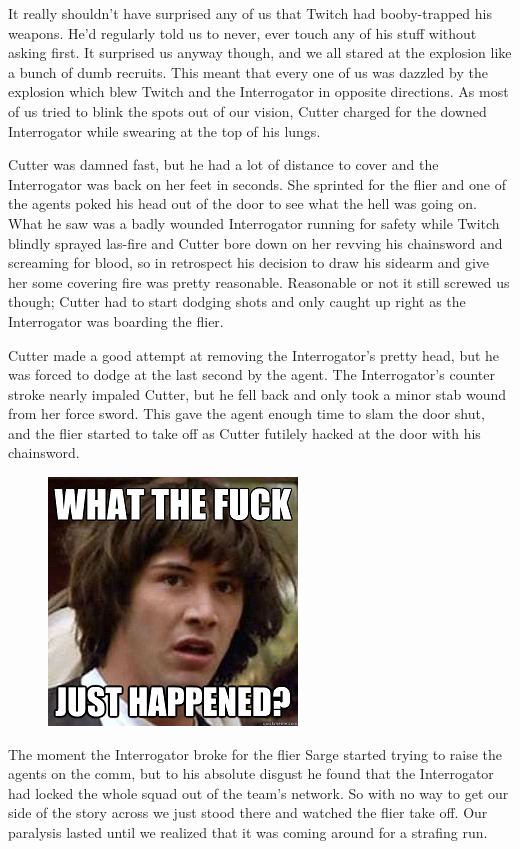 It really shouldn’t have surprised any of us that Twitch had booby-trapped his weapons. He’d regularly told us to never, ever touch any of his stuff without asking first. 
It surprised us anyway though, and we all stared at the explosion like a bunch of dumb recruits. 
This meant that every one of us was dazzled by the explosion which blew Twitch and the Interrogator in opposite directions. 
As most of us tried to blink the spots out of our vision, Cutter charged for the downed Interrogator while swearing at the top of his lungs.

Cutter was damned fast, but he had a lot of distance to cover and the Interrogator was back on her feet in seconds. 
She sprinted for the flier and one of the agents poked his head out of the door to see what the hell was going on. 
What he saw was a badly wounded Interrogator running for safety while Twitch blindly sprayed las-fire and Cutter bore down on her revving his chainsword and screaming for blood, so in retrospect his decision to draw his sidearm and give her some covering fire was pretty reasonable. 
Reasonable or not it still screwed us though; Cutter had to start dodging shots and only caught up right as the Interrogator was boarding the flier.

Cutter made a good attempt at removing the Interrogator’s pretty head, but he was forced to dodge at the last second by the agent. 
The Interrogator’s counter stroke nearly impaled Cutter, but he fell back and only took a minor stab wound from her force sword. 
This gave the agent enough time to slam the door shut, and the flier started to take off as Cutter futilely hacked at the door with his chainsword.

\begin{figure}
	\begin{center}
		\includegraphics[width=\figwidth]{pics/5/23.png}
	\end{center}
\end{figure}
The moment the Interrogator broke for the flier Sarge started trying to raise the agents on the comm, but to his absolute disgust he found that the Interrogator had locked the whole squad out of the team’s network. 
So with no way to get our side of the story across we just stood there and watched the flier take off. 
Our paralysis lasted until we realized that it was coming around for a strafing run. 


